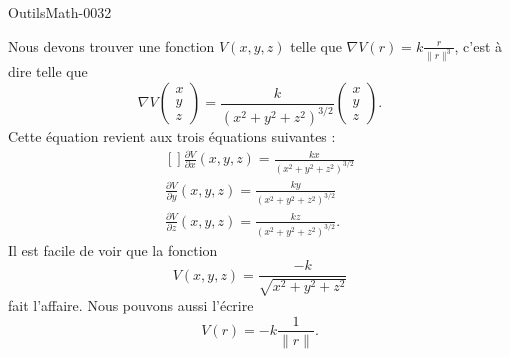 
\begin{corrige}{OutilsMath-0032}

    Nous devons trouver une fonction $V(x,y,z)$ telle que $\nabla V(r)=k\frac{ r }{ \| r \|^3 }$, c'est à dire telle que
    \begin{equation}
        \nabla V\begin{pmatrix}
            x    \\ 
            y    \\ 
            z    
        \end{pmatrix}=\frac{ k }{ (x^2+y^2+z^2)^{3/2} }\begin{pmatrix}
            x    \\ 
            y    \\ 
            z    
        \end{pmatrix}.
    \end{equation}
    Cette équation revient aux trois équations suivantes :
    \begin{equation}
        \begin{aligned}[]
            \frac{ \partial V }{ \partial x }(x,y,z)=\frac{ kx }{ (x^2+y^2+z^2)^{3/2} }\\
            \frac{ \partial V }{ \partial y }(x,y,z)=\frac{ ky }{ (x^2+y^2+z^2)^{3/2} }\\
            \frac{ \partial V }{ \partial z }(x,y,z)=\frac{ kz }{ (x^2+y^2+z^2)^{3/2} }.
        \end{aligned}
    \end{equation}
    Il est facile de voir que la fonction
    \begin{equation}
        V(x,y,z)=\frac{ -k }{ \sqrt{x^2+y^2+z^2} }
    \end{equation}
    fait l'affaire. Nous pouvons aussi l'écrire
    \begin{equation}
        V(r)=-k\frac{1}{ \| r \| }.
    \end{equation}
\end{corrige}
